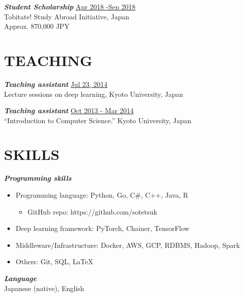 \documentclass[margin, 10pt]{res} %
\begin{document}
\begin{resume}
{\sl {\bf Student Scholarship}} \hfill {\small \underline{Apr 2018 -Sep 2018}} \\
Tobitate! Study Abroad Initiative, Japan \\
Approx. 870,000 JPY

\section{{\small TEACHING}}
{\sl {\bf Teaching assistant}} \hfill {\small \underline{Jul 23, 2014}} \\
Lecture sessions on deep learning, Kyoto University, Japan

{\sl {\bf Teaching assistant}} \hfill {\small \underline{Oct 2013 - Mar 2014}} \\
``Introduction to Computer Science.'' Kyoto University, Japan

\section{{\small SKILLS}}
{\sl {\bf Programming skills}} \vspace{0.5em}
\begin{itemize}
\item Programming language: Python, Go, C\#, C++, Java, R
  \begin{itemize}
  \item GitHub repo: https://github.com/sotetsuk
  \end{itemize}
\item Deep learning framework: PyTorch, Chainer, TensorFlow
\item Middleware/Infrastructure: Docker, AWS, GCP, RDBMS, Hadoop, Spark
\item Others: Git, SQL, LaTeX
\end{itemize}

{\sl {\bf Language}}\\
Japanese (native), English

\end{resume}
\end{document}
